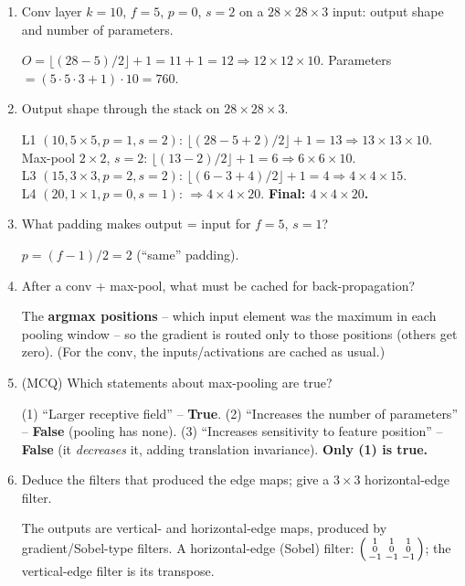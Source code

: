 \documentclass[10pt,a4paper]{article}
\newcommand{\q}[1]{\item #1}
\begin{document}
\begin{enumerate}[leftmargin=*,label=\textbf{Q\arabic*.}]

\q Conv layer $k=10$, $f=5$, $p=0$, $s=2$ on a $28\times28\times3$ input: output shape and number of parameters.
\begin{answerbox}
$O=\lfloor(28-5)/2\rfloor+1 = 11+1 = 12 \Rightarrow 12\times12\times10$. Parameters $=(5\cdot5\cdot3+1)\cdot10 = 760$.
\end{answerbox}

\q Output shape through the stack on $28\times28\times3$.
\begin{answerbox}
L1 $(10,5\times5,p{=}1,s{=}2)$: $\lfloor(28-5+2)/2\rfloor+1=13 \Rightarrow 13\times13\times10$.\\
Max-pool $2\times2$, $s{=}2$: $\lfloor(13-2)/2\rfloor+1=6 \Rightarrow 6\times6\times10$.\\
L3 $(15,3\times3,p{=}2,s{=}2)$: $\lfloor(6-3+4)/2\rfloor+1=4 \Rightarrow 4\times4\times15$.\\
L4 $(20,1\times1,p{=}0,s{=}1)$: $\Rightarrow 4\times4\times20$. \textbf{Final: $4\times4\times20$.}
\end{answerbox}

\q What padding makes output = input for $f=5$, $s=1$?
\begin{answerbox}
$p=(f-1)/2 = 2$ (``same'' padding).
\end{answerbox}

\q After a conv + max-pool, what must be cached for back-propagation?
\begin{answerbox}
The \textbf{argmax positions} -- which input element was the maximum in each pooling window -- so the gradient is routed only to those positions (others get zero). (For the conv, the inputs/activations are cached as usual.)
\end{answerbox}

\q (MCQ) Which statements about max-pooling are true?
\begin{answerbox}
(1) ``Larger receptive field'' -- \textbf{True}. (2) ``Increases the number of parameters'' -- \textbf{False} (pooling has none). (3) ``Increases sensitivity to feature position'' -- \textbf{False} (it \emph{decreases} it, adding translation invariance). \textbf{Only (1) is true.}
\end{answerbox}

\q Deduce the filters that produced the edge maps; give a $3\times3$ horizontal-edge filter.
\begin{answerbox}
The outputs are vertical- and horizontal-edge maps, produced by gradient/Sobel-type filters. A horizontal-edge (Sobel) filter: $\begin{psmallmatrix}1&1&1\\0&0&0\\-1&-1&-1\end{psmallmatrix}$; the vertical-edge filter is its transpose.
\end{answerbox}


\end{enumerate}
\end{document}
